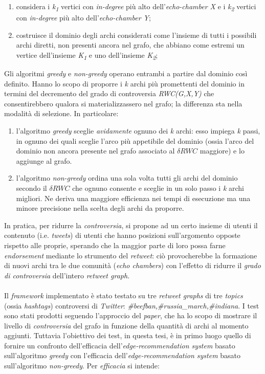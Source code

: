 \begin{enumerate}
\item considera i \textit{k\textsubscript{1}} vertici con \textit{in-degree} più alto dell'\textit{echo-chamber X} e i \textit{k\textsubscript{2}} vertici con \textit{in-degree} più alto dell'\textit{echo-chamber Y};
\item costruisce il dominio degli archi considerati come l'insieme di tutti i possibili archi diretti, non presenti ancora nel grafo, che abbiano come estremi un vertice dell'insieme \textit{K\textsubscript{1}} e uno dell'insieme \textit{K\textsubscript{2}};  
\end{enumerate}
Gli algoritmi \textit{greedy} e \textit{non-greedy} operano entrambi a partire dal dominio così definito. Hanno lo scopo di proporre i \textit{k} archi più promettenti del dominio in termini del decremento del grado di controversia \textit{RWC(G,X,Y)} che consentirebbero qualora si materializzassero nel grafo; la differenza sta nella modalità di selezione. In particolare:
\begin{enumerate}
\item l'algoritmo \textit{greedy} sceglie \textit{avidamente} ognuno dei \textit{k} archi: esso impiega \textit{k} passi, in ognuno dei quali sceglie l'arco più appetibile del dominio (ossia l'arco del dominio non ancora presente nel grafo associato al $\delta RWC$ maggiore) e lo aggiunge al grafo.
\item l'algoritmo \textit{non-greedy} ordina una sola volta tutti gli archi del dominio secondo il $\delta RWC$ che ognuno consente e sceglie in un solo passo i \textit{k} archi migliori. Ne deriva una maggiore efficienza nei tempi di esecuzione ma una minore precisione nella scelta degli archi da proporre.
\end{enumerate}
In pratica, per ridurre la \textit{controversia}, si propone ad un certo insieme di utenti il contenuto (i.e. \textit{tweets}) di utenti che hanno posizioni sull'argomento opposte rispetto alle proprie, sperando che la maggior parte di loro possa farne \textit{endorsement} mediante lo strumento del \textit{retweet}: ciò provocherebbe la formazione di nuovi archi tra le due comunità (\textit{echo chambers}) con l'effetto di ridurre il \textit{grado di controversia} dell'intero \textit{retweet graph}.  
\\\\Il \textit{framework} implementato è stato testato su tre \textit{retweet graphs} di tre \textit{topics} (ossia \textit{hashtags}) controversi di \textit{Twitter}: \textit{\#beefban,\#russia\_march,\#indiana}. I test sono stati prodotti seguendo l'approccio del \textit{paper}\cite{garimella:paper}, che ha lo scopo di mostrare il livello di \textit{controversia} del grafo in funzione della quantità di archi al momento aggiunti. Tuttavia l'obiettivo dei test, in questa tesi, è in primo luogo quello di fornire un confronto dell'efficacia dell'\textit{edge-recommendation system} basato sull'algoritmo \textit{greedy} con l'efficacia dell'\textit{edge-recommendation system} basato sull'algoritmo \textit{non-greedy}. Per \textit{efficacia} si intende:
